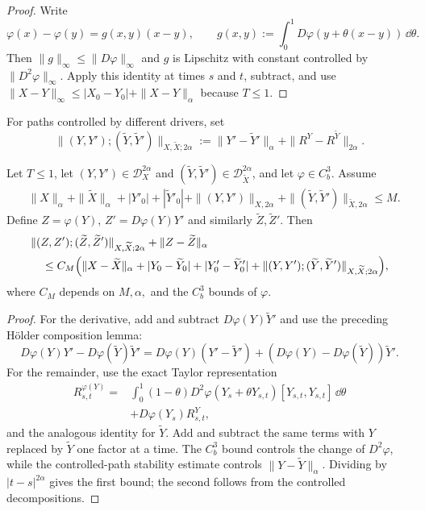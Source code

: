 \begin{proof}
Write
\[
  \varphi(x)-\varphi(y)=g(x,y)(x-y),
  \qquad
  g(x,y):=\int_0^1D\varphi(y+\theta(x-y))\,\dd\theta.
\]
Then $\|g\|_\infty\le\|D\varphi\|_\infty$ and
$g$ is Lipschitz with constant controlled by $\|D^2\varphi\|_\infty$.  Apply
this identity at times $s$ and $t$, subtract, and use
$\|X-Y\|_\infty\le|X_0-Y_0|+\|X-Y\|_\alpha$ because $T\le1$.
\end{proof}

For paths controlled by different drivers, set
\[
 \|(Y,Y');(\widetilde Y,\widetilde Y')\|_{X,\widetilde X;2\alpha}
 :=\|Y'-\widetilde Y'\|_\alpha
   +\|R^Y-R^{\widetilde Y}\|_{2\alpha}.
\]

\begin{thm}
Let $T\le1$, let $(Y,Y')\in\mathscr D_X^{2\alpha}$ and
$(\widetilde Y,\widetilde Y')\in\mathscr D_{\widetilde X}^{2\alpha}$, and let
$\varphi\in C_b^3$.  Assume
\begin{align*}
&\|X\|_\alpha+\|\widetilde X\|_\alpha
 +|Y'_0|+|\widetilde Y'_0|
 +\|(Y,Y')\|_{X,2\alpha}
 +\|(\widetilde Y,\widetilde Y')\|_{\widetilde X,2\alpha}
 \le M.
\end{align*}
Define $Z=\varphi(Y)$, $Z'=D\varphi(Y)Y'$ and similarly
$\widetilde Z,\widetilde Z'$.  Then
\begin{align*}
 &\|(Z,Z');(\widetilde Z,\widetilde Z')\|_{X,\widetilde X;2\alpha}
 +\|Z-\widetilde Z\|_\alpha\\
 &\quad\le C_M\Bigl(
  \|X-\widetilde X\|_\alpha
  +|Y_0-\widetilde Y_0|
  +|Y'_0-\widetilde Y'_0|
  +\|(Y,Y');(\widetilde Y,\widetilde Y')\|_{X,\widetilde X;2\alpha}
 \Bigr),
\end{align*}
where $C_M$ depends on $M,\alpha,$ and the $C_b^3$ bounds of $\varphi$.
\end{thm}

\begin{proof}
For the derivative, add and subtract
$D\varphi(Y)\widetilde Y'$ and use the preceding Hölder composition lemma:
\[
 D\varphi(Y)Y'-D\varphi(\widetilde Y)\widetilde Y'
 =D\varphi(Y)(Y'-\widetilde Y')
  +(D\varphi(Y)-D\varphi(\widetilde Y))\widetilde Y'.
\]
For the remainder, use the exact Taylor representation
\begin{align*}
R^{\varphi(Y)}_{s,t}
={}&\int_0^1(1-\theta)
 D^2\varphi(Y_s+\theta Y_{s,t})[Y_{s,t},Y_{s,t}]\,\dd\theta\\
&+D\varphi(Y_s)R^Y_{s,t},
\end{align*}
and the analogous identity for $\widetilde Y$.  Add and subtract the same
terms with $Y$ replaced by $\widetilde Y$ one factor at a time.  The $C_b^3$
bound controls the change of $D^2\varphi$, while the controlled-path stability
estimate controls $\|Y-\widetilde Y\|_\alpha$.  Dividing by
$|t-s|^{2\alpha}$ gives the first bound; the second follows from the
controlled decompositions.
\end{proof}

